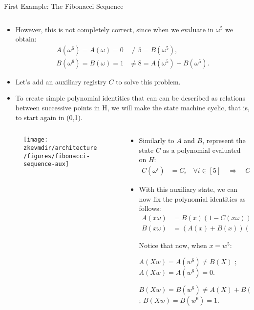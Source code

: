 \begin{frame}[allowframebreaks]{First Example: The Fibonacci Sequence}
\begin{columns}
\begin{column}{0.7\textwidth}
\begin{itemize}
\item However, this is not completely correct, since when we evaluate in $\omega^5$ we obtain:
\begin{align*}
A(\omega^6) = A(\omega) = 0 &\neq  5 = B(\omega^5), \\
B(\omega^6) = B(\omega) = 1 &\neq  8 = A(\omega^5) + B(\omega^5).
\end{align*}

\item Let's add an auxiliary registry $C$ to solve this problem.
\item To create simple polynomial identities that can can be described as relations between successive points in H, 
we will make the state machine cyclic, that is, to start again in (0,1).
\end{itemize}
\end{column}
\end{columns}

\begin{columns}
\begin{column}{0.4\textwidth}
\begin{figure}
	\texttt{[image: \\zkevmdir/architecture/figures/fibonacci-sequence-aux]}
\end{figure}
\end{column}
\begin{column}{0.6\textwidth}
\begin{itemize}
\small
\item Similarly to $A$ and $B$, represent the state $C$ as a polynomial evaluated on $H$:
\begin{align*}
C(\omega^i) &= C_i \quad \forall i \in [5] \quad \Longrightarrow \quad C = [1, 0, 0, 0, 0].
\end{align*}
\item With this auxiliary state, we can now fix the polynomial identities as follows:
\begin{align*}
A(x\omega) &=  B(x)(1 - C(x\omega)), \\
B(x\omega) &=  (A(x) + B(x))(1 - C(x\omega)) + C(x\omega).
\end{align*}

Notice that now, when $x = w^5$:

$A(Xw) = A(w^6) \neq B(X)$ ; $A(Xw) = A(w^6) = 0$.

$B(Xw) = B(w^6) \neq A(X)+B(X)$ ; $B(Xw) = B(w^6) = 1$.
\end{itemize}
\end{column}
\end{columns}
\end{frame}



